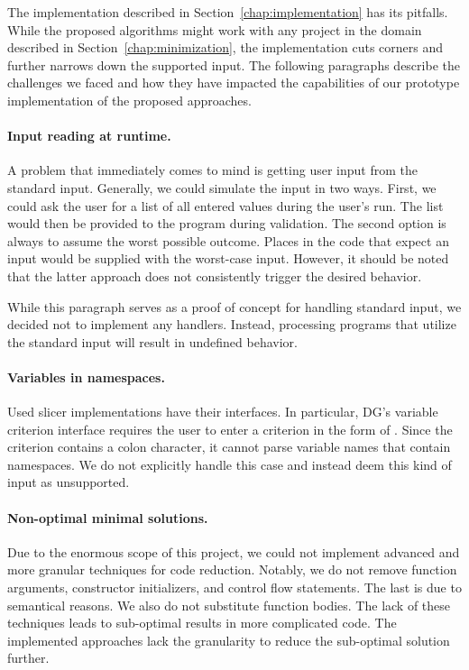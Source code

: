 The implementation described in Section~\ref{chap:implementation} has its 
pitfalls. 
While the proposed algorithms might work with any project in the domain 
described in Section~\ref{chap:minimization}, the implementation cuts corners 
and further narrows down the supported input. 
The following paragraphs describe the challenges we faced and how they have 
impacted the capabilities of our prototype implementation of the proposed 
approaches.

\paragraph{Input reading at runtime.}
A problem that immediately comes to mind is getting user input from 
the standard input. 
Generally, we could simulate the input in two ways. 
First, we could ask the user for a list of all entered values during 
the user's run. 
The list would then be provided to the program during validation. 
The second option is always to assume the worst possible outcome. 
Places in the code that expect an input would be supplied with 
the worst-case input. 
However, it should be noted that the latter approach does not consistently 
trigger the desired behavior.

While this paragraph serves as a proof of concept for handling standard 
input, we decided not to implement any handlers. 
Instead, processing programs that utilize the standard input will result in 
undefined behavior.


\paragraph{Variables in namespaces.}
Used slicer implementations have their interfaces. 
In particular, DG's variable criterion interface requires the user to enter 
a criterion in the form of . 
Since the criterion contains a colon character, it cannot parse variable 
names that contain namespaces. 
We do not explicitly handle this case and instead deem this kind of input as 
unsupported.

\paragraph{Non-optimal minimal solutions.}
Due to the enormous scope of this project, we could not implement advanced 
and more granular techniques for code reduction. 
Notably, we do not remove function arguments, constructor initializers, and 
control flow statements. 
The last is due to semantical reasons. 
We also do not substitute function bodies. 
The lack of these techniques leads to sub-optimal results in more 
complicated code. 
The implemented approaches lack the granularity to reduce the sub-optimal 
solution further. 

